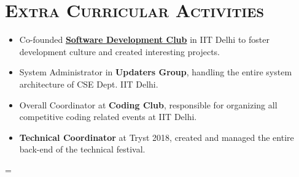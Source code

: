 \documentclass{article}
\newenvironment{longversion}{}{} %
\newenvironment{absolutelynopagebreak}
  {\par\nobreak\vfil\penalty0\vfilneg
   \vtop\bgroup}
  {\par\xdef\tpd{\the\prevdepth}\egroup
   \prevdepth=\tpd}
\newcommand{\tmpsection}[1]{}
\let\tmpsection=\section
\renewcommand{\section}[1]{\tmpsection*{\textsc{#1}}}
\begin{document}
\begin{absolutelynopagebreak}
\begin{longversion}
\end{longversion}

\section{Extra Curricular Activities}


\begin{itemize}
    \setlength\itemsep{0em}
    \item Co-founded \textbf{\href{http://devclub.iitd.ac.in/}{Software Development Club}} in IIT Delhi to foster development culture and created interesting projects.
    \item System Administrator in \textbf{Updaters Group}, handling the entire system architecture of CSE Dept. IIT Delhi.
    \item Overall Coordinator at \textbf{Coding Club}, responsible for organizing all competitive coding related events at IIT Delhi.
    \item \textbf{Technical Coordinator} at Tryst 2018, created and managed the entire back-end of the technical festival.
     
\end{itemize}
\end{absolutelynopagebreak}
\end{document}
